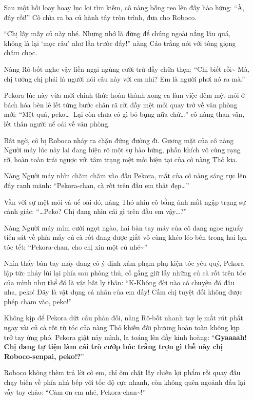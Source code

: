 \documentclass[../main.tex]{subfiles}
\begin{document}
Sau một hồi loay hoay lục lọi tìm kiếm, cô nàng bỗng reo lên đầy hào hứng: ``À, đây rồi!'' Cô chìa ra ba củ hành tây tròn trĩnh, đưa cho Roboco.

``Chị lấy mấy củ này nhé. Nhưng nhớ là đừng để chúng ngoài nắng lâu quá, không là lại `mọc râu' như lần trước đấy!'' nàng Cáo trắng nói với tông giọng châm chọc.

Nàng Rô-bốt nghe vậy liền ngại ngùng cười trừ đầy chữa thẹn: ``Chị biết rồi\~{} Mà, chị tưởng chị phải là người nói câu này với em nhỉ? Em là người phơi nó ra mà.''

\ct

Pekora lúc này vừa mới chính thức hoàn thành xong ca làm việc đêm mệt mỏi ở bách hóa bèn lê lết từng bước chân rã rời đầy mệt mỏi quay trở về văn phòng mới: ``Mệt quá, peko\dots\ Lại còn chưa có gì bỏ bụng nữa chứ\dots'' cô nàng than vãn, lết thân người uể oải về văn phòng.

Bất ngờ, cô bị Roboco nhảy ra chặn đứng đường đi. Gương mặt của cô nàng Người máy lúc này lại đang hiện rõ một sự hào hứng, phấn khích vô cùng rạng rỡ, hoàn toàn trái ngược với tâm trạng mệt mỏi hiện tại của cô nàng Thỏ kia.

Nàng Người máy nhìn chăm chăm vào đầu Pekora, mắt của cô nàng sáng rực lên đầy ranh mãnh: ``Pekora-chan, cà rốt trên đầu em thật đẹp\dots''

Vẫn với sự mệt mỏi và uể oải đó, nàng Thỏ nhìn cô bằng ánh mắt ngập trạng sự cảnh giác: ``\dots Peko? Chị đang nhìn cái gì trên đầu em vậy\dots?''

Nàng Người máy mỉm cười ngọt ngào, hai bàn tay máy của cô đang ngoe nguẩy tiến sát về phía mấy củ cà rốt đang được giắt vô cùng khéo léo bên trong hai lọn tóc tết: ``Pekora-chan, cho chị xin một củ nhé\~{}''

Nhìn thấy bàn tay máy đang có ý định xâm phạm phụ kiện tóc yêu quý, Pekora lập tức nhảy lùi lại phía sau phòng thủ, cố gắng giữ lấy những củ cà rốt trên tóc của mình như thể đó là vật bất ly thân: ``K-Không đời nào có chuyện đó đâu nha, peko! Đây là vật dụng cá nhân của em đấy! Cấm chị tuyệt đối không được phép chạm vào, peko!''

Không kịp để Pekora dứt câu phản đối, nàng Rô-bốt nhanh tay lẹ mắt rút phắt ngay vài củ cà rốt từ tóc của nàng Thỏ khiến đối phương hoàn toàn không kịp trở tay ứng phó. Pekora giật nảy mình, la toáng lên đầy kinh hoàng: ``\textbf{Gyaaaah! Chị đang tự tiện làm cái trò cướp bóc trắng trợn gì thế này chị Roboco-senpai, peko!?}''

Roboco không thèm trả lời cô em, chỉ ôm chặt lấy chiến lợi phẩm rồi quay đầu chạy biến về phía nhà bếp với tốc độ cực nhanh, còn không quên ngoảnh đầu lại vẫy tay chào: ``Cảm ơn em nhé, Pekora-chan\~{}!''
\end{document}
